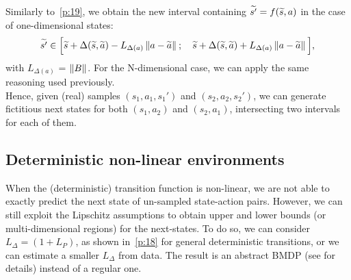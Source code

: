 Similarly to~\eqref{p:19}, we obtain the new interval containing $\widetilde{s'} = f(\widetilde{s}, a)$ in the case of one-dimensional states:
\begin{align}
\widetilde{s'} \in \Big[\widetilde{s} + \Delta(\widetilde{s},\widetilde{a}) - L_{\Delta (a)}\left\|a - \widetilde{a}\right\|_{}; \quad \widetilde{s} + \Delta(\widetilde{s},\widetilde{a}) + L_{\Delta (a)}\left\|a - \widetilde{a}\right\|_{} \Big],\label{p:25}
\end{align}
with $L_{\Delta (a)}$ = $\left\|B\right\|_{}$. For the N-dimensional case, we can apply the same reasoning used previously.\\
\newline
Hence, given (real) samples $(s_1,a_1,s_1')$ and $(s_2, a_2, s_2')$, we can generate fictitious next states for both $(s_1,a_2)$ and $(s_2,a_1)$, intersecting two intervals for each of them.

\subsection{Deterministic non-linear environments} \label{app:b2}
When the (deterministic) transition function is non-linear, we are not able to exactly predict the next state of un-sampled state-action pairs. However, we can still exploit the Lipschitz assumptions to obtain upper and lower bounds (or multi-dimensional regions) for the next-states. To do so, we can consider $L_{\Delta} = \left(1 + L_{P} \right)$, as shown in~\eqref{p:18} for general deterministic transitions, or we can estimate a smaller $L_{\Delta}$ from data.
The result is an abstract \ac{BMDP} (see  for details) instead of a regular one.\\
\newline
